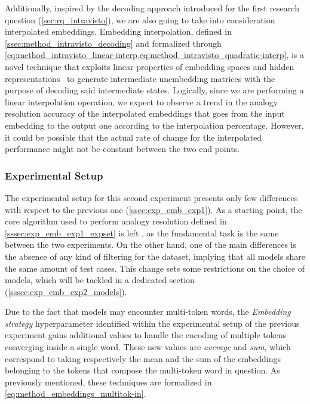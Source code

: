 Additionally, inspired by the decoding approach introduced for the first research question (\cref{sec:rq_intravisto}), we are also going to take into consideration interpolated embeddings.
Embedding interpolation, defined in \cref{ssec:method_intravisto_decoding} and formalized through \cref{eq:method_intravisto_linear-interp,eq:method_intravisto_quadratic-interp}, is a novel technique that exploits linear properties of embedding spaces and hidden representations~\cite{park2023, mikolov2013, drozd2016} to generate intermediate unembedding matrices with the purpose of decoding said intermediate states.
Logically, since we are performing a linear interpolation operation, we expect to observe a trend in the analogy resolution accuracy of the interpolated embeddings that goes from the input embedding to the output one according to the interpolation percentage.
However, it could be possible that the actual rate of change for the interpolated performance might not be constant between the two end points. 

\subsubsection{Experimental Setup}\label{sssec:exp_emb_exp2_expset}

The experimental setup for this second experiment presents only few differences with respect to the previous one (\cref{ssec:exp_emb_exp1}).
As a starting point, the core algorithm used to perform analogy resolution defined in \cref{sssec:exp_emb_exp1_expset} is left , as the fundamental task is the same between the two experiments.
On the other hand, one of the main differences is the absence of any kind of filtering for the dataset, implying that all models share the same amount of test cases.
This change  sets some restrictions on the choice of models, which will be tackled in a dedicated section (\cref{sssec:exp_emb_exp2_models}).

Due to the fact that models may encounter multi-token words, the \emph{Embedding strategy} hyperparameter identified within the experimental setup of the previous experiment gains additional values to handle the encoding of multiple tokens converging inside a single word.
These new values are \emph{average} and \emph{sum}, which correspond to taking respectively the mean and the sum of the embeddings belonging to the tokens that compose the multi-token word in question.
As previously mentioned, these techniques are formalized in \cref{eq:method_embeddings_multitok-in}.

